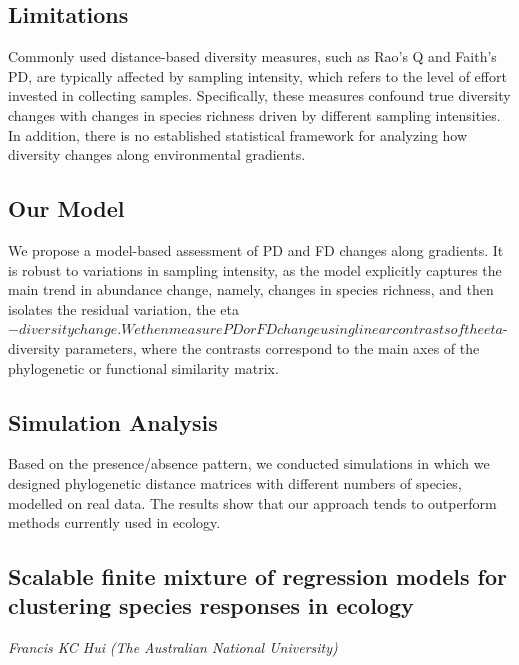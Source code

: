 \documentclass[
]{scrreprt}
\begin{document}
\subsection{Limitations}\label{limitations}

Commonly used distance-based diversity measures, such as Rao's Q and
Faith's PD, are typically affected by sampling intensity, which refers
to the level of effort invested in collecting samples. Specifically,
these measures confound true diversity changes with changes in species
richness driven by different sampling intensities. In addition, there is
no established statistical framework for analyzing how diversity changes
along environmental gradients.

\subsection{Our Model}\label{our-model}

We propose a model-based assessment of PD and FD changes along
gradients. It is robust to variations in sampling intensity, as the
model explicitly captures the main trend in abundance change, namely,
changes in species richness, and then isolates the residual variation,
the
eta\(-diversity change. We then measure PD or FD change using linear contrasts of the eta\)-diversity
parameters, where the contrasts correspond to the main axes of the
phylogenetic or functional similarity matrix.

\subsection{Simulation Analysis}\label{simulation-analysis}

Based on the presence/absence pattern, we conducted simulations in which
we designed phylogenetic distance matrices with different numbers of
species, modelled on real data. The results show that our approach tends
to outperform methods currently used in ecology.

\subsection{Scalable finite mixture of regression models for clustering
species responses in
ecology}\label{scalable-finite-mixture-of-regression-models-for-clustering-species-responses-in-ecology}

\emph{Francis KC Hui} \emph{(The Australian
National University)}
\end{document}
